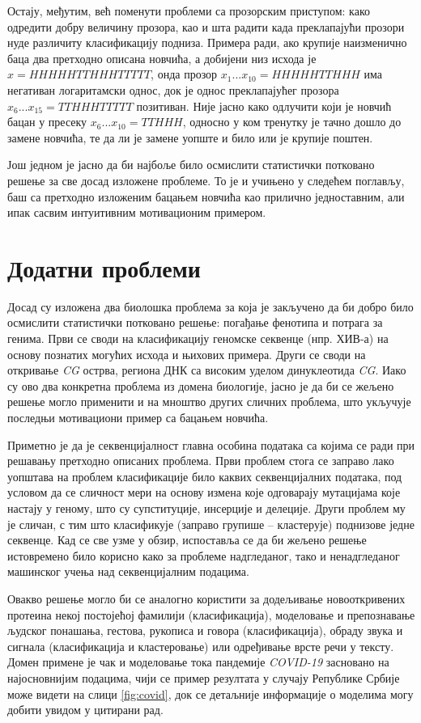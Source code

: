 \documentclass[12pt,oneside]{memoir}
\begin{document}
\begin{CJK}{UTF8}{ipxm}
Остају, међутим, већ поменути проблеми са прозорским приступом: како одредити добру величину прозора, као и шта радити када преклапајући прозори нуде различиту класификацију подниза. Примера ради, ако крупије наизменично баца два претходно описана новчића, а добијени низ исхода је $x = HHHHHTTHHHTTTTT$, онда прозор $x_1...x_{10} = HHHHHTTHHH$ има негативан логаритамски однос, док је однос преклапајућег прозора $x_6...x_{15} = TTHHHTTTTT$ позитиван. Није јасно како одлучити који је новчић бацан у пресеку $x_6...x_{10} = TTHHH$, односно у ком тренутку је тачно дошло до замене новчића, те да ли је замене уопште и било или је крупије поштен.

Још једном је јасно да би најбоље било осмислити статистички потковано решење за све досад изложене проблеме. То је и учињено у следећем поглављу, баш са претходно изложеним бацањем новчића као прилично једноставним, али ипак сасвим интуитивним мотивационим примером.

\section{Додатни проблеми}
Досад су изложена два биолошка проблема за која је закључено да би добро било осмислити статистички потковано решење: погађање фенотипа и потрага за генима. Први се своди на класификацију геномске секвенце (нпр. ХИВ-а) на основу познатих могућих исхода и њихових примера. Други се своди на откривање \textit{CG} острва, региона ДНК са високим уделом динуклеотида \textit{CG}. Иако су ово два конкретна проблема из домена биологије, јасно је да би се жељено решење могло применити и на мноштво других сличних проблема, што укључује последњи мотивациони пример са бацањем новчића.

Приметно је да је секвенцијалност главна особина података са којима се ради при решавању претходно описаних проблема. Први проблем стога се заправо лако уопштава на проблем класификације било каквих секвенцијалних података, под условом да се сличност мери на основу измена које одговарају мутацијама које настају у геному, што су супституције, инсерције и делеције. Други проблем му је сличан, с тим што класификује (заправо групише -- кластерује) поднизове једне секвенце. Кад се све узме у обзир, испоставља се да би жељено решење истовремено било корисно како за проблеме надгледаног, тако и ненадгледаног машинског учења над секвенцијалним подацима\cite{khoda2014}.

Овакво решење могло би се аналогно користити за додељивање новооткривених протеина некој постојећој фамилији\cite{nguyen2016} (класификација), моделовање и препознавање људског понашања, гестова, рукописа и говора\cite{gales2007} (класификација), обраду звука и сигнала\cite{andreao2006} (класификација и кластеровање) или одређивање врсте речи у тексту\cite{mutjaba2020}. Домен примене је чак и моделовање тока пандемије \textit{COVID-19} засновано на најосновнијим подацима, чији се пример резултата у случају Републике Србије може видети на слици \ref{fig:covid}, док се детаљније информације о моделима могу добити увидом у цитирани рад.


\end{CJK}
\end{document}
